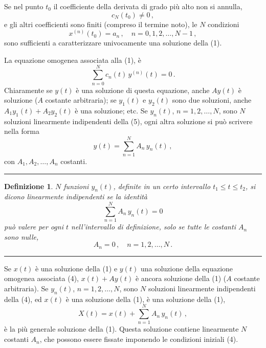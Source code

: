 \documentclass[11pt, a4paper]{book}
\numberwithin{equation}{section}
\newtheorem{definizione}{Definizione}[section]
\begin{document}
Se nel punto $t_0$ il coefficiente della derivata di grado più alto non si annulla,
\begin{equation}
    c_N(t_0) \neq 0 \,,
\end{equation}
e gli altri coefficienti sono finiti (compreso il termine noto), le $N$ condizioni
\begin{equation}
    x^{(n)}(t_0) = a_n \,, \quad n = 0, 1, 2, \ldots, N-1 \,,
\end{equation}
sono sufficienti a caratterizzare univocamente una soluzione della (1).

La equazione omogenea associata alla (1), è
\begin{equation}
    \sum_{n=0}^{N} c_n(t) \, y^{(n)}(t) = 0 \,.
\end{equation}
Chiaramente se $y(t)$ è una soluzione di questa equazione, anche $Ay(t)$ è
soluzione ($A$ costante arbitraria); se $y_1(t)$ e $y_2(t)$ sono due soluzioni,
anche $A_1 y_1(t) + A_2 y_2(t)$ è una soluzione; etc. Se $y_n(t)$, $n = 1, 2,
\ldots, N$, sono $N$ soluzioni linearmente indipendenti della (5), ogni altra
soluzione si può scrivere nella forma
\begin{equation}
    y(t) = \sum_{n=1}^{N} A_n \, y_n(t) \,,
\end{equation}
con $A_1, A_2, \ldots, A_n$ costanti.

\noindent\rule{\textwidth}{0.4pt}
\begin{definizione}
$N$ funzioni $y_n(t)$, definite in un certo intervallo $t_1 \leq t \leq t_2$, si dicono
\emph{linearmente indipendenti} se la identità
\[
    \sum_{n=1}^{N} A_n \, y_n(t) = 0
\]
può valere per ogni $t$ nell'intervallo di definizione, solo se tutte le costanti
$A_n$ sono nulle,
\[
    A_n = 0 \,, \quad n = 1, 2, \ldots, N \,.
\]
\end{definizione}
\noindent\rule{\textwidth}{0.4pt}

Se $x(t)$ è una soluzione della (1) e $y(t)$ una soluzione della equazione
omogenea associata (4), $x(t) + Ay(t)$ è ancora soluzione della (1) ($A$ costante
arbitraria). Se $y_n(t)$, $n = 1, 2, \ldots, N$, sono $N$ soluzioni linearmente
indipendenti della (4), ed $x(t)$ è una soluzione della (1), è una soluzione
della (1),
\begin{equation}
    X(t) = x(t) + \sum_{n=1}^{N} A_n \, y_n(t) \,, \tag{6}
\end{equation}
è la più generale soluzione della (1). Questa soluzione contiene linearmente
$N$ costanti $A_n$, che possono essere fissate imponendo le condizioni iniziali (4).
\end{document}
